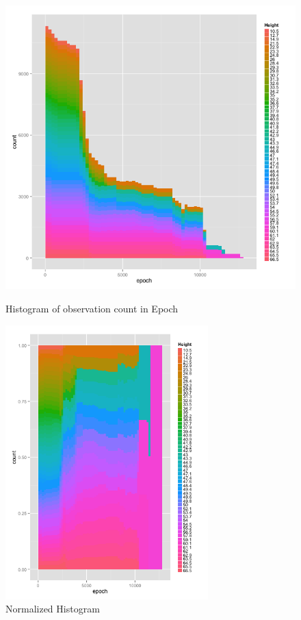 \documentclass[english]{article}\usepackage[]{graphicx}\usepackage[]{color}
\begin{document}
\begin{figure}[H]
\centering
\begin{minipage}{.70\textwidth}
\centering
\includegraphics[width=\linewidth]{plot1}
\caption{Histogram of observation count in Epoch}
\label{fig:test1}
\end{minipage}\hfill
\begin{minipage}{.30\textwidth}
\centering
\includegraphics[width = \linewidth, height=300pt]{plot2}
\caption{Normalized Histogram}
\label{fig:test2}
\end{minipage}
\end{figure}
\end{document}
